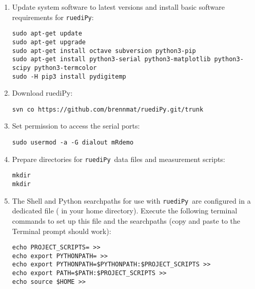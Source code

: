 \documentclass[12pt]{article}   	%
\newcommand{\ruediPy}{\texttt{ruediPy}}
\begin{document}
\begin{enumerate}

\item Update system software to latest versions and install basic software requirements for \ruediPy:\par
\texttt{sudo apt-get update}\\
\texttt{sudo apt-get upgrade}\\
\texttt{sudo apt-get install octave subversion python3-pip}\\
\texttt{sudo apt-get install python3-serial python3-matplotlib python3-scipy python3-termcolor}\\
\texttt{sudo -H pip3 install pydigitemp}\\

\item Download ruediPy:\par
\texttt{svn co https://github.com/brennmat/ruediPy.git/trunk }


\item Set permission to access the serial ports:\par
\texttt{sudo usermod -a -G dialout mRdemo}

\item Prepare directories for \ruediPy\ data files and measurement scripts:\par
\texttt{mkdir }\\
\texttt{mkdir }

\item The Shell and Python searchpaths for use with \ruediPy\ are configured in a dedicated file ( in your home directory). Execute the following terminal commands to set up this file and the searchpaths (copy and paste to the Terminal prompt should work):\par
{\scriptsize
\mbox{\texttt{echo PROJECT_SCRIPTS= >> }}\\
\mbox{\texttt{echo export PYTHONPATH= >> }}\\
\mbox{\texttt{echo export PYTHONPATH=\textsc{}\$PYTHONPATH\textsc{}:\textsc{}\$PROJECT_SCRIPTS\textsc{} >> }}\\
\mbox{\texttt{echo export PATH=\textsc{}\$PATH\textsc{}:\textsc{}\$PROJECT_SCRIPTS\textsc{} >> }}\\
\mbox{\texttt{echo source \textsc{}\$HOME\textsc{} >> }}
}


\end{enumerate}
\end{document}
